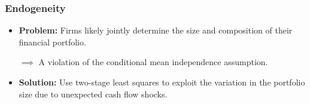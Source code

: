 \documentclass[handout]{beamer}
\begin{document}
\begin{frame}[label=endogeneity]
\frametitle{Endogeneity}

\begin{itemize}[<+->]
\item \textbf{Problem:} Firms likely jointly determine the size and composition of their financial portfolio.

\bigskip

$\implies$ A violation of the conditional mean independence assumption.

\bigskip

\item \textbf{Solution:} Use two-stage least squares to exploit the variation in the portfolio size due to unexpected cash flow shocks. \hyperlink{unexpected}{}
\end{itemize}

\end{frame}
\end{document}
